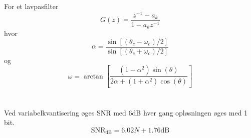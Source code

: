 \documentclass[12pt,a4paper]{report}
\begin{document}
For et lavpasfilter
\begin{equation}
G(z)=\frac{z^{-1}-a_k}{1-a_kz^{-1}}
\end{equation}
hvor
\begin{equation}
\alpha=\frac{\sin[(\theta_c-\omega_c)/2]}{\sin[(\theta_c+\omega_c)/2]}
\end{equation}
og
\begin{equation}
\omega=\arctan\left[\frac{(1-\alpha^2)\sin(\theta)}{2\alpha+(1+\alpha^2)\cos(\theta)}
\right]
\end{equation}
\clearpage
{}\\\\
Ved variabelkvantisering øges SNR med 6dB hver gang opløsningen øges med 1 bit.
\begin{equation}
\text{SNR}_{\text{dB}}=6.02N+1.76\text{dB}
\end{equation}
\end{document}
